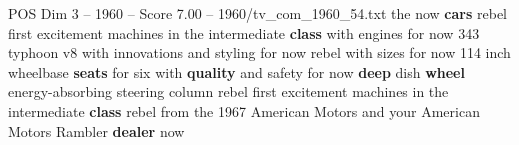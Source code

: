 \begin{textsample}{POS Dim 3 – 1960 – Score 7.00 – 1960/tv\_com\_1960\_54.txt}  \label{ex:f3_pos_021}
the now \textbf{cars} rebel first excitement machines in the intermediate \textbf{class} with engines for now 343 typhoon v8 with innovations and styling for now rebel with sizes for now 114 inch wheelbase \textbf{seats} for six with \textbf{quality} and safety for now \textbf{deep} dish \textbf{wheel} energy-absorbing steering column rebel first excitement machines in the intermediate \textbf{class} rebel from the 1967 American Motors and your American Motors Rambler \textbf{dealer} now

\end{textsample}
